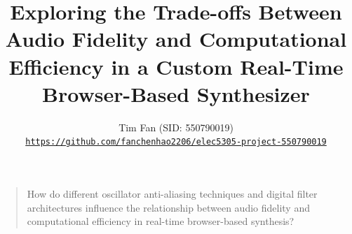 \documentclass[journal]{IEEEtran}
\title{Exploring the Trade-offs Between Audio Fidelity and Computational Efficiency in a Custom Real-Time Browser-Based Synthesizer}
\author{
	Tim Fan (SID: 550790019) \\
	\texttt{\url{https://github.com/fanchenhao2206/elec5305-project-550790019}}
}
\begin{document}

\maketitle

\begin{quote}
How do different oscillator anti-aliasing techniques and digital filter architectures influence the relationship between audio fidelity and computational efficiency in real-time browser-based synthesis?
\end{quote}

\end{document}
